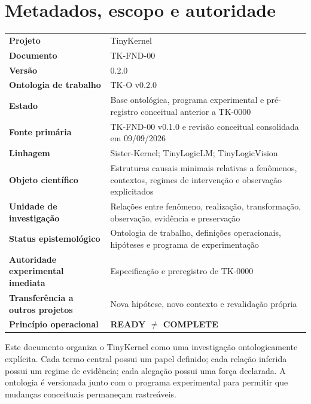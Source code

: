 \documentclass[11pt,a4paper]{article}
\begin{document}
\section*{Metadados, escopo e autoridade}

\begin{tabularx}{\textwidth}{>{\bfseries}p{4.0cm}X}
\toprule
Projeto & TinyKernel \\
Documento & TK-FND-00 \\
Versão & 0.2.0 \\
Ontologia de trabalho & TK-O v0.2.0 \\
Estado & Base ontológica, programa experimental e pré-registro conceitual anterior a TK-0000 \\
Fonte primária & TK-FND-00 v0.1.0 e revisão conceitual consolidada em 09/09/2026 \\
Linhagem & Sister-Kernel; TinyLogicLM; TinyLogicVision \\
Objeto científico & Estruturas causais minimais relativas a fenômenos, contextos, regimes de intervenção e observação explicitados \\
Unidade de investigação & Relações entre fenômeno, realização, transformação, observação, evidência e preservação \\
Status epistemológico & Ontologia de trabalho, definições operacionais, hipóteses e programa de experimentação \\
Autoridade experimental imediata & Especificação e preregistro de TK-0000 \\
Transferência a outros projetos & Nova hipótese, novo contexto e revalidação própria \\
Princípio operacional & \textbf{READY $\neq$ COMPLETE} \\
\bottomrule
\end{tabularx}

\begin{ontologybox}
Este documento organiza o TinyKernel como uma investigação ontologicamente explícita.
Cada termo central possui um papel definido; cada relação inferida possui um regime de
evidência; cada alegação possui uma força declarada. A ontologia é versionada junto com
o programa experimental para permitir que mudanças conceituais permaneçam rastreáveis.
\end{ontologybox}

\tableofcontents
\newpage
\end{document}
